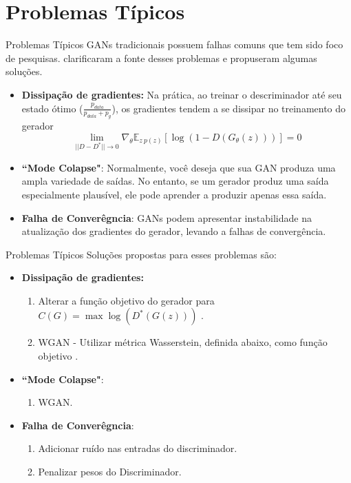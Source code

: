 \documentclass[10pt]{beamer}
\begin{document}
\AtBeginSection{}
\section[Problemas Típicos]{Problemas Típicos}
\begin{frame}[fragile]{Problemas Típicos}
GANs tradicionais possuem falhas comuns que tem sido foco
de pesquisas. \citet{arjovsky2017} clarificaram a fonte desses
problemas e propuseram algumas soluções.
\small
\begin{itemize}
	\item \textbf{Dissipação de gradientes:} Na prática, ao treinar
	o descriminador até seu estado ótimo ($\frac{p_{data}}
	{p_{data} + p_g}$), os gradientes tendem a se dissipar
	no treinamento do gerador
  $$\lim_{||D-D^*||\to0}\nabla_{\theta}\mathbb{E}_{z~p(z)}\left[\log{(1-D(G_{\theta}(z)))}\right] = 0$$

  \item  \textbf{``Mode Colapse"}: Normalmente, você deseja que sua GAN
  produza uma ampla variedade de saídas. No entanto, se um gerador produz
  uma saída especialmente plausível, ele pode aprender a produzir apenas
  essa saída.

  \item \textbf{Falha de Converêgncia}: GANs podem apresentar instabilidade
  na atualização dos gradientes do gerador, levando a falhas de
  convergência.
\end{itemize}

\end{frame}

\begin{frame}[fragile]{Problemas Típicos}
Soluções propostas para esses problemas são:
\small
\begin{itemize}
	\item \textbf{Dissipação de gradientes:}
	\begin{enumerate}
		\item Alterar a função objetivo do gerador para
		$C(G) = \max \log(D^*(G(z)))$ \citep{goodfellow2014}.
		\item WGAN - Utilizar métrica Wasserstein, definida abaixo,
		como função objetivo \citep{wgan2017}.
	\end{enumerate}

  \item  \textbf{``Mode Colapse"}:
	\begin{enumerate}
		\item WGAN.
	\end{enumerate}

  \item \textbf{Falha de Converêgncia}:
	\begin{enumerate}
		\item Adicionar ruído nas entradas do discriminador.
  
  		\item Penalizar pesos do Discriminador.

	\end{enumerate}
\end{itemize}

\end{frame}
\end{document}
